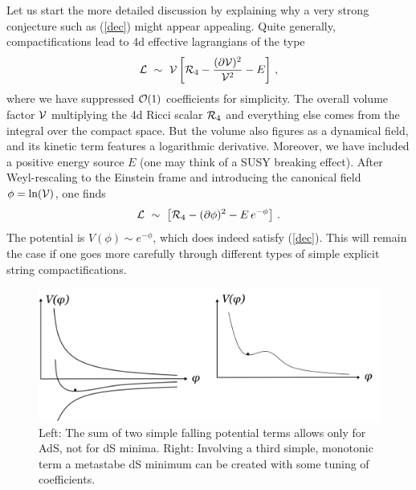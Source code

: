 \documentclass[12pt]{article}
\newcommand{\be}{\begin{equation}}
\newcommand{\ee}{\end{equation}}
\numberwithin{equation}{section}
\begin{document}
Let us start the more detailed discussion by explaining why a very strong conjecture such as (\ref{dec}) might appear appealing. Quite generally, compactifications lead to 4d effective lagrangians of the type
\be
{\cal L}\,\,\sim\,\,{\cal V}\left[{\cal R}_4-\frac{(\partial 
{\cal V})^2}{{\cal V}^2}-E\right]\,,
\ee
where we have suppressed ${\cal O}(1)$ coefficients for simplicity. The overall volume factor ${\cal V}$ multiplying the 4d Ricci scalar ${\cal R}_4$ and everything else comes from the integral over the compact space. But the volume also figures as a dynamical field, and its kinetic term features a logarithmic derivative. Moreover, we have included a positive energy source $E$ (one may think of a SUSY breaking effect). After Weyl-rescaling to the Einstein 
frame and introducing the canonical field $\phi=\ln({\cal V})$, one finds
\be
{\cal L}\,\,\sim\,\,\left[{\cal R}_4-(\partial \phi)^2-E\,e^{-\phi}
\right]\,.
\ee
The potential is $V(\phi)\sim e^{-\phi}$, which does indeed satisfy (\ref{dec}). This will remain the case if one goes more carefully through different types of simple explicit string compactifications.


\begin{figure}[ht]
\begin{center} 
\includegraphics[width=12cm]{adsds.png}
\caption{Left: The sum of two simple falling potential terms allows only for AdS, not for dS minima. Right: Involving a third simple, monotonic term a metastabe dS minimum can be created with some tuning of coefficients.}
\label{adsds} 
\end{center}
\end{figure}
\end{document}
